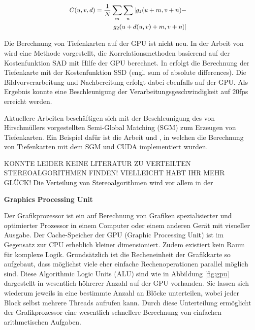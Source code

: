 \documentclass[times, 10pt,twocolumn]{article}
\begin{document}
\begin{align}
\small 
\begin{split}
C(u,v,d) = \frac{1}{N}\sum\limits_{m} \sum\limits_{n} | g_1(u+m,v+n) - \\ g_2(u+d(u,v)+m,v+n)|
\label{eq:sad}
\end{split}
\end{align}


Die Berechnung von Tiefenkarten auf der GPU ist nicht neu. In der Arbeit von \cite{Yang.2002} wird eine Methode vorgestellt, die Korrelationsmethoden basierend auf der Kostenfunktion SAD mit Hilfe der GPU berechnet. In \cite{Woetzel.2004} erfolgt die Berechnung der Tiefenkarte mit der Kostenfunktion SSD (engl. sum of absolute differences). Die Bildvorverarbeitung und Nachbereitung erfolgt dabei ebenfalls auf der GPU. Als Ergebnis konnte eine Beschleunigung der Verarbeitungsgeschwindigkeit auf 20fps erreicht werden.

Aktuellere Arbeiten beschäftigen sich mit der Beschleunigung des von Hirschmüllers vorgestellten Semi-Global Matching (SGM) \cite{Hirschmuller.2005} zum Erzeugen von Tiefenkarten. Ein Beispiel dafür ist die Arbeit \cite{Hirschmueller.2008} und \cite{Rosenberg.2006}, in welchen die Berechnung von Tiefenkarten mit dem SGM und CUDA implementiert wurden.

{\color{red}KONNTE LEIDER KEINE LITERATUR ZU VERTEILTEN STEREOALGORITHMEN FINDEN! VIELLEICHT HABT IHR MEHR GLÜCK!
Die Verteilung von Stereoalgorithmen wird vor allem in der}

 \textbf{Graphics Processing Unit}
 
Der Grafikprozessor ist ein auf Berechnung von Grafiken spezialisierter und optimierter Prozessor in einem Computer oder einem anderen Gerät mit visueller Ausgabe.
Der Cache-Speicher der GPU (Graphic Processing Unit) ist im Gegensatz zur CPU erheblich kleiner dimensioniert. Zudem existiert kein Raum für komplexe Logik. Grundsätzlich ist die Recheneinheit der Grafikkarte so aufgebaut, dass möglichst viele eher einfache Rechenoperationen parallel möglich sind.
Diese Algorithmic Logic Units (ALU) sind wie in Abbildung \ref{fig:gpu} dargestellt in wesentlich höhrerer Anzahl auf der GPU vorhanden. Sie lassen sich wiederum jeweils in eine bestimmte Anzahl an Blöcke unterteilen, wobei jeder Block selbst mehrere Threads aufrufen kann. Durch diese Unterteilung ermöglicht der Grafikprozessor eine wesentlich schnellere Berechnung von einfachen arithmetischen Aufgaben.
\end{document}
